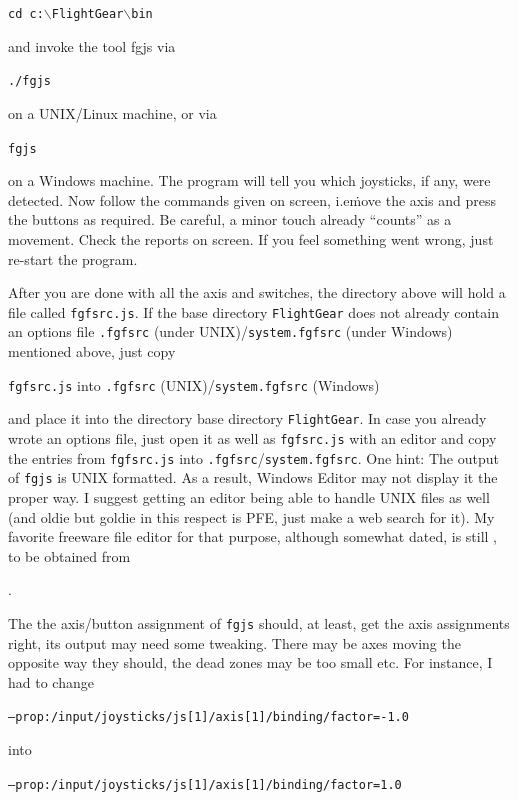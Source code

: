 \noindent
\texttt{cd c:$\backslash$FlightGear$\backslash$bin}

and invoke the tool fgjs via

\noindent
\texttt{./fgjs}

on a UNIX/Linux machine, or via

\noindent
\texttt{fgjs}

on a Windows machine. The program will tell you which joysticks, if any, were detected. Now follow the commands given on screen, i.e\. move the axis and press the buttons as required. Be careful, a minor touch already ``counts'' as a movement. Check the reports on screen. If you feel something went wrong, just re-start the program.

After you are done with all the axis and switches, the directory above will hold a file called \texttt{fgfsrc.js}. If the \FlightGear{} base directory \texttt{FlightGear} does not already contain an options file \texttt{.fgfsrc} (under UNIX)/\texttt{system.fgfsrc} (under Windows) mentioned above, just copy
\medskip

\noindent
 \texttt{fgfsrc.js} into \texttt{.fgfsrc} (UNIX)/\texttt{system.fgfsrc} (Windows) 
 \medskip

\noindent 
and place it into the directory \FlightGear{} base directory \texttt{FlightGear}. In case you already wrote an options file, just open it as well as \texttt{fgfsrc.js} with an editor and copy the entries from \texttt{fgfsrc.js} into \texttt{.fgfsrc}/\texttt{system.fgfsrc}. One hint: The output of \texttt{fgjs} is UNIX formatted. As a result, Windows Editor may not display it the proper way. I suggest getting an editor being able to handle UNIX files as well (and oldie but goldie in this respect is PFE, just make a web search for it). My favorite freeware file editor for that purpose, although somewhat dated, is still , to be obtained from

.

The the axis/button assignment of \texttt{fgjs} should, at least, get the axis assignments right, its output may need some tweaking. There may be axes moving the opposite way they should, the dead zones may be too small etc. For instance, I had to change 

\texttt{--prop:/input/joysticks/js[1]/axis[1]/binding/factor=-1.0}

into

\texttt{--prop:/input/joysticks/js[1]/axis[1]/binding/factor=1.0}

